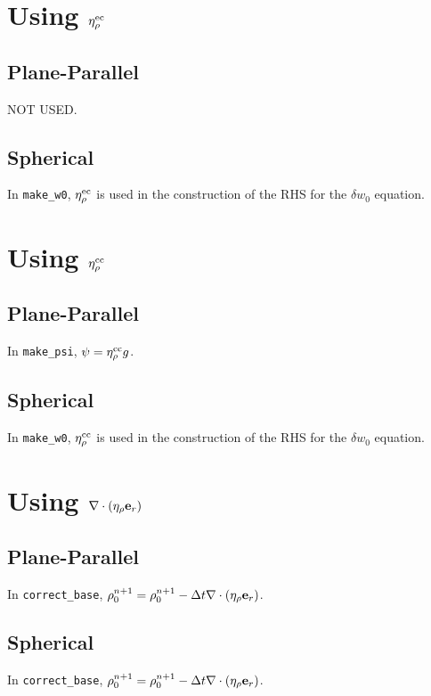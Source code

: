 \documentclass[11pt]{article}
\def\eb         {{\bf e}}
\def\etarho     {\eta_\rho}
\def\etarhoec   {\etarho^{\rm ec}}
\def\etarhocc   {\etarho^{\rm cc}}
\def\divetarho  {\nabla\cdot(\etarho\eb_r)}
\begin{document}
\section{Using $\etarhoec$}
\subsection{Plane-Parallel}
NOT USED.
\subsection{Spherical}
In {\tt make\_w0}, $\etarhoec$ is used in the construction of the RHS for the $\delta w_0$ equation.
\section{Using $\etarhocc$}
\subsection{Plane-Parallel}
In {\tt make\_psi}, $\psi = \etarhocc g$.
\subsection{Spherical}
In {\tt make\_w0}, $\etarhocc$ is used in the construction of the RHS for the $\delta w_0$ equation.
\section{Using $\divetarho$}
\subsection{Plane-Parallel}
In {\tt correct\_base}, $\rho_0^{n+1} = \rho_0^{n+1} - \Delta t \divetarho$.
\subsection{Spherical}
In {\tt correct\_base}, $\rho_0^{n+1} = \rho_0^{n+1} - \Delta t \divetarho$. \\
\end{document}
